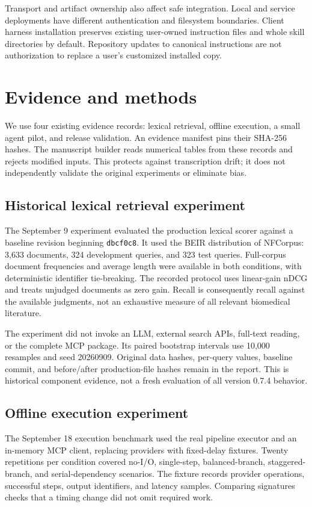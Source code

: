 \documentclass[11pt]{article}
\begin{document}
Transport and artifact ownership also affect safe integration. Local and service
deployments have different authentication and filesystem boundaries. Client
harness installation preserves existing user-owned instruction files and whole
skill directories by default. Repository updates to canonical instructions are
not authorization to replace a user's customized installed copy.

\section{Evidence and methods}
We use four existing evidence records: lexical retrieval, offline execution,
a small agent pilot, and release validation. An evidence manifest pins their
SHA-256 hashes. The manuscript builder reads numerical tables from these records
and rejects modified inputs. This protects against transcription drift; it does
not independently validate the original experiments or eliminate bias.

\subsection{Historical lexical retrieval experiment}
The September 9 experiment evaluated the production lexical scorer against a
baseline revision beginning \texttt{dbcf0c8}. It used the BEIR distribution of
NFCorpus: 3,633 documents, 324 development queries, and 323 test queries. Full-corpus
document frequencies and average length were available in both conditions, with
deterministic identifier tie-breaking. The recorded protocol uses linear-gain
nDCG and treats unjudged documents as zero gain. Recall is consequently recall
against the available judgments, not an exhaustive measure of all relevant
biomedical literature.

The experiment did not invoke an LLM, external search APIs, full-text reading,
or the complete MCP package. Its paired bootstrap intervals use 10,000 resamples
and seed 20260909. Original data hashes, per-query values, baseline commit, and
before/after production-file hashes remain in the report. This is historical
component evidence, not a fresh evaluation of all version 0.7.4 behavior.

\subsection{Offline execution experiment}
The September 18 execution benchmark used the real pipeline executor and an
in-memory MCP client, replacing providers with fixed-delay fixtures. Twenty
repetitions per condition covered no-I/O, single-step, balanced-branch,
staggered-branch, and serial-dependency scenarios. The fixture records provider
operations, successful steps, output identifiers, and latency samples. Comparing
signatures checks that a timing change did not omit required work.
\end{document}
